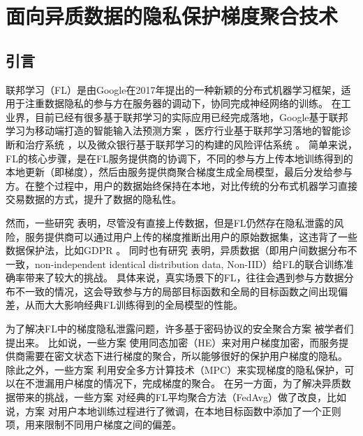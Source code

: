 \chapter{面向异质数据的隐私保护梯度聚合技术}

\section{引言}
联邦学习\cite{mcmahan2017communication}（FL）是由Google在2017年提出的一种新颖的分布式机器学习框架，适用于注重数据隐私的参与方在服务器的调动下，协同完成神经网络的训练。
在工业界，目前已经有很多基于联邦学习的实际应用已经完成落地，Google基于联邦学习为移动端打造的智能输入法预测方案 \cite{hard2018federated}，医疗行业基于联邦学习落地的智能诊断和治疗系统 \cite{li2020deepfed}，以及微众银行基于联邦学习的构建的风险评估系统 \cite{DBLP:conf/ndss/CaoF0G21}。 
简单来说，FL的核心步骤，是在FL服务提供商的协调下，不同的参与方上传本地训练得到的本地更新（即梯度），然后由服务提供商聚合梯度生成全局模型，最后分发给参与方。在整个过程中，用户的数据始终保持在本地，对比传统的分布式机器学习直接交易数据的方式，提升了数据的隐私性。

然而，一些研究 \cite{geiping2020inverting,zhu2019deep,gao2021privacy} 表明，尽管没有直接上传数据，但是FL仍然存在隐私泄露的风险，服务提供商可以通过用户上传的梯度推断出用户的原始数据集，这违背了一些数据保护法，比如GDPR \cite{voigt2017eu}。
同时也有研究 \cite{zhao2018federated, tuor2021overcoming, yoshida2019hybrid}表明，异质数据（即用户间数据分布不一致，non-independent identical distribution data, Non-IID）给FL的联合训练准确率带来了较大的挑战。
具体来说，真实场景下的FL，往往会遇到参与方数据分布不一致的情况，这会导致参与方的局部目标函数和全局的目标函数之间出现偏差，从而大大影响经典FL训练得到的全局模型的性能。


为了解决FL中的梯度隐私泄露问题，许多基于密码协议的安全聚合方案 \cite{liu2021privacy, aono2017privacy, zhang2020batchcrypt, dong2021flod, hao2021efficient} 被学者们提出来。
比如说，一些方案 \cite{liu2021privacy, aono2017privacy, zhang2020batchcrypt} 使用同态加密（HE）来对用户梯度加密，而服务提供商需要在密文状态下进行梯度的聚合，所以能够很好的保护用户梯度的隐私。
除此之外，一些方案 \cite{hao2021efficient, dong2021flod} 利用安全多方计算技术（MPC）来实现梯度的隐私保护，可以在不泄漏用户梯度的情况下，完成梯度的聚合。
在另一方面，为了解决异质数据带来的挑战，一些方案 \cite{li2020federated, gao2022feddc, ghosh2020efficient, briggs2020federated}对经典的FL平均聚合方法（FedAvg\cite{mcmahan2017communication}）做了改良，比如说，方案 \cite{li2020federated} 对用户本地训练过程进行了微调，在本地目标函数中添加了一个正则项，用来限制不同用户梯度之间的偏差。

